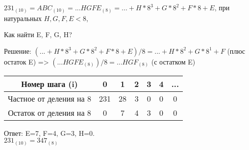 \small{
$231_{(10)}=ABC_{(10)}=...HGFE_{(8)}=...+H*8^{3}+G*8^{2}+F*8+E$, при натуральных $H, G, F ,E<8$,\par
\begin{center}
        Как найти E, F, G, H?
\end{center}
Решение: $(...+H*8^{3}+G*8^{2}+F*8+E)/8= ...+H*8^{2}+G*8^{1}+F$ (плюс остаток E) => $(...HGFE_{(8)})/8=...HGF_{(8)}$ (с остатком E)\\
\begin{center}
    \begin{tabular}{|c|c|c|c|c|c|c|}
    \hline
        Номер шага (i) & 0 & 1 & 2 & 3 & 4 & ...\\
        \hline
        Частное от деления на 8 & 231 & 28 & 3 & 0 & 0 & 0\\
        \hline
        Остаток от деления на 8 & 0 & 7 & 4 & 3 & 0 & 0\\
        \hline
    \end{tabular}
    \vspace{1em}
        
    Ответ: E=7, F=4, G=3, H=0.\\
    $231_{(10)}=347_{(8)}$
\end{center}
}
